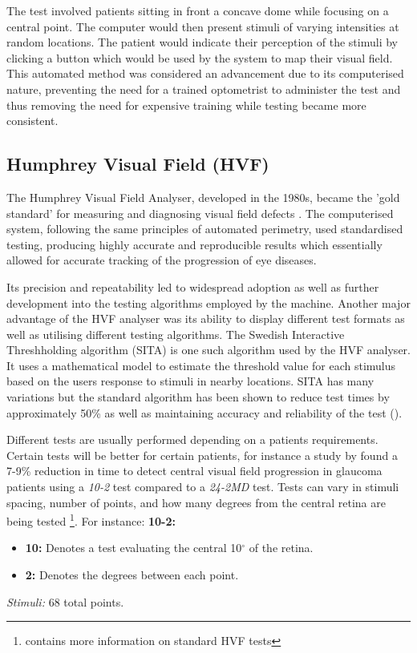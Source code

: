\documentclass{l4proj}
\begin{document}
The test involved patients sitting in front a concave dome while focusing on a central point. The computer would then present stimuli of varying intensities at random locations. The patient would indicate their perception of the stimuli by clicking a button which would be used by the system to map their visual field. This automated method was considered an advancement due to its computerised nature, preventing the need for a trained optometrist to administer the test and thus removing the need for expensive training while testing became more consistent.


\subsection{Humphrey Visual Field (HVF)}
The Humphrey Visual Field Analyser, developed in the 1980s, became the 'gold standard' for measuring and diagnosing visual field defects \citep{NantiLenoci2021}. The computerised system, following the same principles of automated perimetry, used standardised testing, producing highly accurate and reproducible results which essentially allowed for accurate tracking of the progression of eye diseases.

Its precision and repeatability led to widespread adoption as well as further development into the testing algorithms employed by the machine. Another major advantage of the HVF analyser was its ability to display different test formats as well as utilising different testing algorithms. The Swedish Interactive Threshholding algorithm (SITA) is one such algorithm used by the HVF analyser. It uses a mathematical model to estimate the threshold value for each stimulus based on the users response to stimuli in nearby locations. SITA has many variations but the standard algorithm has been shown to reduce test times by approximately 50\% as well as maintaining accuracy and reliability of the test (\cite{Ramulu2022SAP}).

Different tests are usually performed depending on a patients requirements. Certain tests will be better for certain patients, for instance a study by \citet{Wu2019ComparingVF} found a 7-9\% reduction in time to detect central visual field progression in glaucoma patients using a \textit{10-2} test compared to a \textit{24-2MD} test.
\newline
Tests can vary in stimuli spacing, number of points, and how many degrees from the central retina are being tested \footnote{\citet{RuiaTripathy2021HVF} contains more information on standard HVF tests}. For instance:
\newline
\newline
\noindent \textbf{10-2:}
\begin{itemize}
    \item \textbf{10:} Denotes a test evaluating the central 10$^\circ$ of the retina.
    \item \textbf{2:} Denotes the degrees between each point.
\end{itemize}
\textit{Stimuli:} 68 total points.
\newline
\newline
\end{document}
